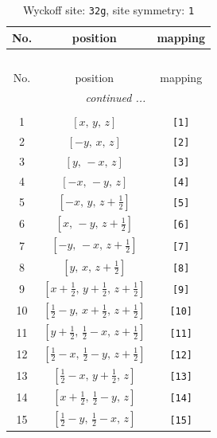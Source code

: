 \documentclass[fleqn,8pt]{jsarticle}
\begin{document}
\renewcommand{\arraystretch}{1.2}
\begin{longtable}{ccc}
\caption{Wyckoff site: {\tt 32g}, site symmetry: {\tt 1}}
 \\
 \hline \hline
No. & position & mapping \\ \hline \endfirsthead

\multicolumn{2}{l}{\tablename\ \thetable{}} \\
 \hline \hline
No. & position & mapping \\ \hline \endhead

 \hline \hline
\multicolumn{2}{r}{\footnotesize\it continued ...} \\ \endfoot

 \hline \hline
\multicolumn{2}{r}{} \\ \endlastfoot

1 & $\left[ x,\, y,\, z \right]$ & {\tt [1]} \\ \hline
2 & $\left[ - y,\, x,\, z \right]$ & {\tt [2]} \\ \hline
3 & $\left[ y,\, - x,\, z \right]$ & {\tt [3]} \\ \hline
4 & $\left[ - x,\, - y,\, z \right]$ & {\tt [4]} \\ \hline
5 & $\left[ - x,\, y,\, z + \frac{1}{2} \right]$ & {\tt [5]} \\ \hline
6 & $\left[ x,\, - y,\, z + \frac{1}{2} \right]$ & {\tt [6]} \\ \hline
7 & $\left[ - y,\, - x,\, z + \frac{1}{2} \right]$ & {\tt [7]} \\ \hline
8 & $\left[ y,\, x,\, z + \frac{1}{2} \right]$ & {\tt [8]} \\ \hline
9 & $\left[ x + \frac{1}{2},\, y + \frac{1}{2},\, z + \frac{1}{2} \right]$ & {\tt [9]} \\ \hline
10 & $\left[ \frac{1}{2} - y,\, x + \frac{1}{2},\, z + \frac{1}{2} \right]$ & {\tt [10]} \\ \hline
11 & $\left[ y + \frac{1}{2},\, \frac{1}{2} - x,\, z + \frac{1}{2} \right]$ & {\tt [11]} \\ \hline
12 & $\left[ \frac{1}{2} - x,\, \frac{1}{2} - y,\, z + \frac{1}{2} \right]$ & {\tt [12]} \\ \hline
13 & $\left[ \frac{1}{2} - x,\, y + \frac{1}{2},\, z \right]$ & {\tt [13]} \\ \hline
14 & $\left[ x + \frac{1}{2},\, \frac{1}{2} - y,\, z \right]$ & {\tt [14]} \\ \hline
15 & $\left[ \frac{1}{2} - y,\, \frac{1}{2} - x,\, z \right]$ & {\tt [15]} \\ \hline

\end{longtable}
\end{document}
